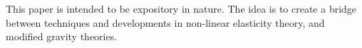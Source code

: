 This paper is intended to be expository in nature. The idea is to create a bridge between techniques and developments in non-linear elasticity theory, and modified gravity theories. 

